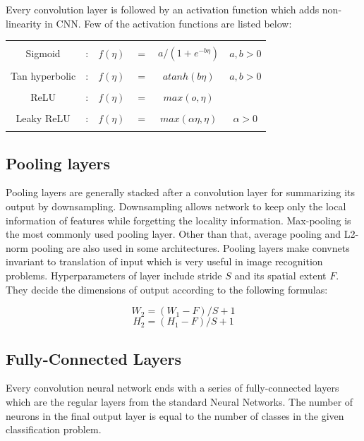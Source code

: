 \documentclass{article} %
\begin{document}
	Every convolution layer is followed by an activation function which adds non-linearity in CNN. Few of the activation functions are listed below:
	\begin{center}
		\begin{tabular}{ c c c c c c }
			& & & & &\\
			Sigmoid &:& $f(\eta)$ &$=$& $a / (1+e^{-b\eta})$ & $a,b>0$\\
			& & & & &\\
			Tan hyperbolic &:& $f(\eta)$ &$=$& $atanh(b\eta)$ & $a,b>0$\\
			& & & & &\\
			ReLU &:& $f(\eta)$ &$=$& $max(o,\eta)$ &\\
			& & & & &\\
			Leaky ReLU &:& $f(\eta)$ &$=$& $max(\alpha \eta, \eta)$ & $\alpha >0$\\
			& & & & &\\
		\end{tabular}
	\end{center}

	
	\subsection{Pooling layers}
	Pooling layers are generally stacked after a convolution layer for summarizing its output by downsampling. Downsampling allows network to keep only the local information of features while forgetting the locality information. Max-pooling is the most commonly used pooling layer. Other than that, average pooling and L2-norm pooling are also used in some architectures. Pooling layers make convnets invariant to translation of input which is very useful in image recognition problems. Hyperparameters of layer include stride $S$ and its spatial extent $F$. They decide the dimensions of output according to the following formulas: 
	
		$$  W_2 = (W_1 - F )/S + 1 $$
		$$  H_2 = (H_1 - F )/S + 1 $$
	
	\subsection{Fully-Connected Layers}
	Every convolution neural network ends with a series of fully-connected layers which are the regular layers from the standard Neural Networks. The number of neurons in the final output layer is equal to the number of classes in the given classification problem.
	
\end{document}
